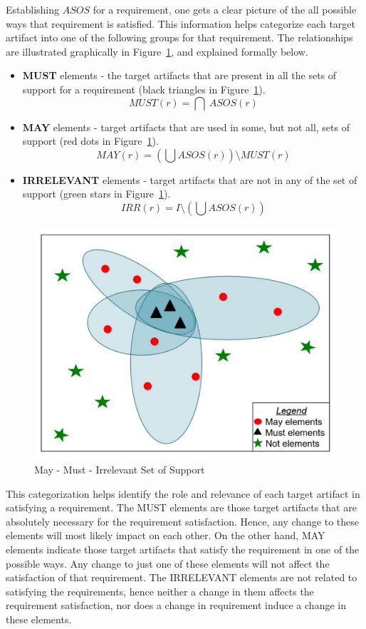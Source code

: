 Establishing $ASOS$ for a requirement, one gets a clear picture of the all possible ways that requirement is satisfied. This information helps categorize each target artifact into one of the following groups for that requirement.  The relationships are illustrated graphically in Figure~\ref{fig:maymust}, and explained formally below.
\begin{itemize}
  \item \textbf{MUST} elements - the target artifacts that are present in all the sets of support for a requirement (black triangles in Figure~\ref{fig:maymust}).
      $$ MUST (r) = \bigcap \ ASOS(r) $$

  \item \textbf{MAY} elements - target artifacts that are used in some, but not all, sets of support (red dots in Figure~\ref{fig:maymust}).
      $$MAY(r) = (\bigcup ASOS (r)) \setminus MUST (r) $$

  \item \textbf{IRRELEVANT} elements - target artifacts that are not in any of the set of support (green stars in Figure~\ref{fig:maymust}). $$IRR(r) = I \setminus (\bigcup ASOS (r))$$
\end{itemize}

\begin{figure}[htb]
\includegraphics[width=\columnwidth]{images/may_must.pdf}
\caption{May - Must - Irrelevant Set of Support}\label{fig:maymust}
\end{figure}

This categorization helps identify the role and relevance of each target artifact in satisfying a requirement. The MUST elements are those target artifacts that are absolutely necessary for the requirement satisfaction. Hence, any change to these elements will most likely impact on each other. On the other hand, MAY elements indicate those target artifacts that satisfy the requirement in one of the possible ways. Any change to just one of these elements will not affect the satisfaction of that requirement. The IRRELEVANT elements are not related to satisfying the requirements, hence neither a change in them affects the requirement satisfaction, nor does a change in requirement induce a change in these elements.


